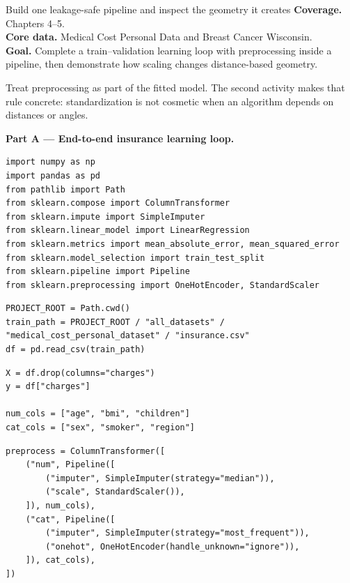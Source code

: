 
\begin{labproject}{Build one leakage-safe pipeline and inspect the geometry it creates}
\textbf{Coverage.} Chapters 4--5.\\
\textbf{Core data.} Medical Cost Personal Data and Breast Cancer Wisconsin.\\
\textbf{Goal.} Complete a train--validation learning loop with preprocessing inside a pipeline, then demonstrate how scaling changes distance-based geometry.

\begin{labmode}
Treat preprocessing as part of the fitted model. The second activity makes that rule concrete: standardization is not cosmetic when an algorithm depends on distances or angles.
\end{labmode}

\medskip\noindent\textbf{Part A --- End-to-end insurance learning loop.}\par
\begin{lstlisting}[style=mlpython]
import numpy as np
import pandas as pd
from pathlib import Path
from sklearn.compose import ColumnTransformer
from sklearn.impute import SimpleImputer
from sklearn.linear_model import LinearRegression
from sklearn.metrics import mean_absolute_error, mean_squared_error
from sklearn.model_selection import train_test_split
from sklearn.pipeline import Pipeline
from sklearn.preprocessing import OneHotEncoder, StandardScaler
\end{lstlisting}

\begin{lstlisting}[style=mlpython]
PROJECT_ROOT = Path.cwd()
train_path = PROJECT_ROOT / "all_datasets" / "medical_cost_personal_dataset" / "insurance.csv"
df = pd.read_csv(train_path)
\end{lstlisting}

\begin{lstlisting}[style=mlpython]
X = df.drop(columns="charges")
y = df["charges"]

num_cols = ["age", "bmi", "children"]
cat_cols = ["sex", "smoker", "region"]
\end{lstlisting}

\begin{lstlisting}[style=mlpython]
preprocess = ColumnTransformer([
    ("num", Pipeline([
        ("imputer", SimpleImputer(strategy="median")),
        ("scale", StandardScaler()),
    ]), num_cols),
    ("cat", Pipeline([
        ("imputer", SimpleImputer(strategy="most_frequent")),
        ("onehot", OneHotEncoder(handle_unknown="ignore")),
    ]), cat_cols),
])
\end{lstlisting}


\end{labproject}
